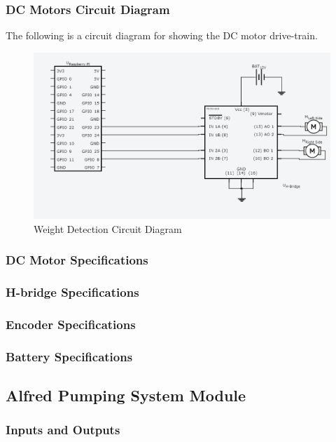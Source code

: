 \documentclass [10pt]{article}
\begin{document}
\subsubsection{DC Motors Circuit Diagram}
The following is a circuit diagram for showing the DC motor drive-train.
\begin{figure} [h!]
	\centering
	\includegraphics [scale = 0.6] {Figures/H_Bridge.png}
	\caption{Weight Detection Circuit Diagram}
\end{figure}

\subsubsection{DC Motor Specifications}

\subsubsection{H-bridge Specifications}

\subsubsection{Encoder Specifications}

\subsubsection{Battery Specifications}

\subsection{Alfred Pumping System Module}

\subsubsection{Inputs and Outputs}
\end{document}
